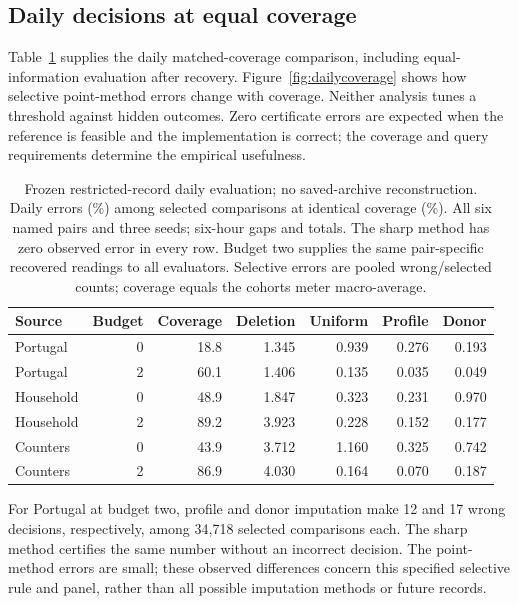 \documentclass[12pt]{article}
\begin{document}
\subsection{Daily decisions at equal coverage}\label{app:matched-daily}
Table~\ref{tab:dailymatched} supplies the daily matched-coverage comparison,
including equal-information evaluation after recovery. Figure~\ref{fig:dailycoverage}
shows how selective point-method errors change with coverage. Neither
analysis tunes a threshold against hidden outcomes. Zero certificate errors
are expected when the reference is feasible and the implementation is
correct; the coverage and query requirements determine the empirical usefulness.
\begin{table}[htbp]
\centering\normalsize\setlength{\tabcolsep}{4pt}
\caption{Frozen restricted-record daily evaluation; no saved-archive reconstruction. Daily errors (\%) among selected comparisons at identical coverage (\%). All six named pairs and three seeds; six-hour gaps and totals. The sharp method has zero observed error in every row. Budget two supplies the same pair-specific recovered readings to all evaluators. Selective errors are pooled wrong/selected counts; coverage equals the cohort\textquotesingle s meter macro-average.}
\label{tab:dailymatched}
\begin{tabular}{lrrrrrr}
\toprule
Source & Budget & Coverage & Deletion & Uniform & Profile & Donor\\
\midrule
Portugal & 0 & 18.8 & 1.345 & 0.939 & 0.276 & 0.193\\
Portugal & 2 & 60.1 & 1.406 & 0.135 & 0.035 & 0.049\\
Household & 0 & 48.9 & 1.847 & 0.323 & 0.231 & 0.970\\
Household & 2 & 89.2 & 3.923 & 0.228 & 0.152 & 0.177\\
Counters & 0 & 43.9 & 3.712 & 1.160 & 0.325 & 0.742\\
Counters & 2 & 86.9 & 4.030 & 0.164 & 0.070 & 0.187\\
\bottomrule
\end{tabular}
\end{table}
For Portugal at budget two, profile and donor imputation make
12 and 17 wrong decisions,
respectively, among 34,718 selected comparisons each.
The sharp method certifies the same number without an incorrect decision.
The point-method errors are small; these observed differences concern this
specified selective rule and panel, rather than all possible imputation
methods or future records.
\end{document}
